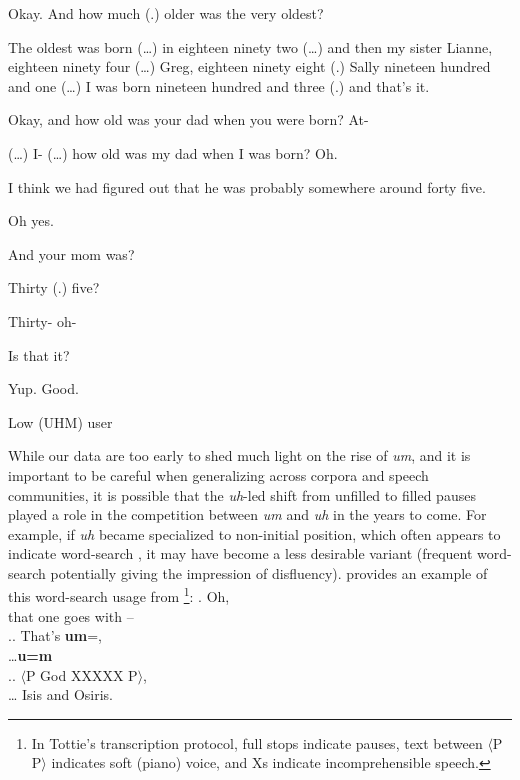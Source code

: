 \documentclass[11pt]{article}
\begin{document}
\begin{extract}[ht!]
    \begin{mdframed}[leftmargin=10pt,rightmargin=10pt]
        \begin{dialogue}

             Okay. And how much (.) older was the very oldest?

             The oldest was born (\ldots) in eighteen ninety two
            (\ldots) and then my sister Lianne, eighteen ninety four (\ldots)
            Greg, eighteen ninety eight (.) Sally nineteen hundred and one
            (\ldots) I was born nineteen hundred and three (.) and that's it.

             Okay, and how old was your dad when you were born? At-

             (\ldots) I- (\ldots) how old was my dad when I was born? Oh.

             I think we had figured out that he was probably
            somewhere around forty five.

             Oh yes.

             And your mom was?

             Thirty (.) five?

             Thirty- oh-

             Is that it?

             Yup. Good.

        \end{dialogue}
    \end{mdframed}
    \caption{Low (UHM) user}\label{ext:lowuhm}
\end{extract}

While our data are too early to shed much light on the rise of \emph{um}, and it
is important to be careful when generalizing across corpora and speech
communities, it is possible that the \emph{uh}-led shift from unfilled to filled
pauses played a role in the competition between \emph{um} and \emph{uh} in the
years to come.
For example, if \emph{uh} became specialized to non-initial
position, which often appears to indicate word-search \parencite{tottie2016,
tottie2017}, it may have become a less desirable variant (frequent word-search
potentially giving the impression of disfluency).
\Next provides an example of this word-search usage from
\textcite[:~(13)]{tottie2016}\footnote{%
    In Tottie's transcription protocol, full stops indicate pauses, text between
    $\langle$P P$\rangle$ indicates soft (piano) voice, and Xs indicate
    incomprehensible speech.
}:
\ex. Oh, \\ that one goes with -- \\.. That's \textbf{um}=, \\
\ldots \textbf{u=m} \\.. $\langle$P God XXXXX P$\rangle$, \\
\ldots{} Isis and Osiris.
\end{document}
